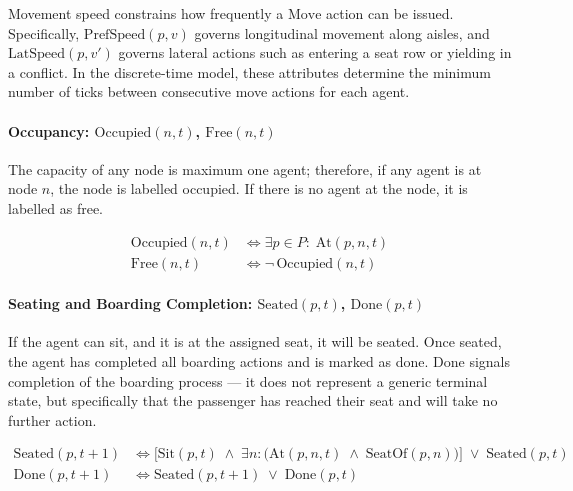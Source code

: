 \documentclass[11pt,a4paper]{article}
\begin{document}
Movement speed constrains how frequently a $\text{Move}$ action can be issued.
Specifically, $\text{PrefSpeed}(p,v)$ governs longitudinal movement along aisles, and
$\text{LatSpeed}(p,v')$ governs lateral actions such as entering a seat row or yielding
in a conflict. In the discrete-time model, these attributes determine the minimum number
of ticks between consecutive move actions for each agent.

\paragraph{Occupancy: $\text{Occupied}(n,t)$, $\text{Free}(n,t)$}

The capacity of any node is maximum one agent; therefore, if any agent is at node $n$, the node is labelled occupied. If there is no agent at the node, it is labelled as free.

\begin{align}
  \text{Occupied}(n,t) &\iff \exists p \in P:\; \text{At}(p,n,t) \label{eq:occupied}\\
  \text{Free}(n,t)     &\iff \neg\,\text{Occupied}(n,t)             \label{eq:free}
\end{align}

\paragraph{Seating and Boarding Completion: $\text{Seated}(p,t)$, $\text{Done}(p,t)$}

If the agent can sit, and it is at the assigned seat, it will be seated. Once seated, the agent has completed all boarding actions and is marked as done. $\text{Done}$ signals completion of the boarding process --- it does not represent a generic terminal state, but specifically that the passenger has reached their seat and will take no further action.

\begin{align}
  \text{Seated}(p,t{+}1)
    &\iff \bigl[\text{Sit}(p,t) \;\wedge\; \exists n:\bigl(\text{At}(p,n,t) \;\wedge\; \text{SeatOf}(p,n)\bigr)\bigr]
          \;\vee\; \text{Seated}(p,t)
    \label{eq:seated}\\[4pt]
  \text{Done}(p,t{+}1)
    &\iff \text{Seated}(p,t{+}1) \;\vee\; \text{Done}(p,t)
    \label{eq:done}
\end{align}
\end{document}
